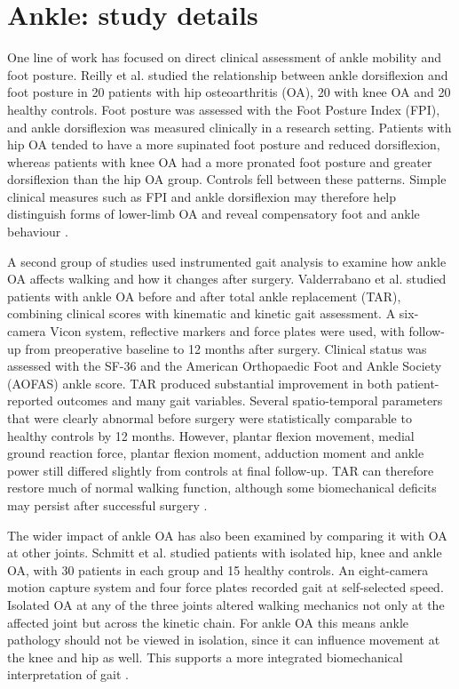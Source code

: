 \documentclass[12pt]{elsarticle}
\begin{document}
\section{Ankle: study details}
\label{supp:S3}
{ One line of work has focused on direct clinical assessment of ankle mobility and foot posture. Reilly et al. \cite{reilly2009role} studied the relationship between ankle dorsiflexion and foot posture in 20 patients with hip osteoarthritis (OA), 20 with knee OA and 20 healthy controls. Foot posture was assessed with the Foot Posture Index (FPI), and ankle dorsiflexion was measured clinically in a research setting. Patients with hip OA tended to have a more supinated foot posture and reduced dorsiflexion, whereas patients with knee OA had a more pronated foot posture and greater dorsiflexion than the hip OA group. Controls fell between these patterns. Simple clinical measures such as FPI and ankle dorsiflexion may therefore help distinguish forms of lower-limb OA and reveal compensatory foot and ankle behaviour \cite{reilly2009role}.}

{ A second group of studies used instrumented gait analysis to examine how ankle OA affects walking and how it changes after surgery. Valderrabano et al. \cite{valderrabano2007gait} studied patients with ankle OA before and after total ankle replacement (TAR), combining clinical scores with kinematic and kinetic gait assessment. A six-camera Vicon system, reflective markers and force plates were used, with follow-up from preoperative baseline to 12 months after surgery. Clinical status was assessed with the SF-36 and the American Orthopaedic Foot and Ankle Society (AOFAS) ankle score. TAR produced substantial improvement in both patient-reported outcomes and many gait variables. Several spatio-temporal parameters that were clearly abnormal before surgery were statistically comparable to healthy controls by 12 months. However, plantar flexion movement, medial ground reaction force, plantar flexion moment, adduction moment and ankle power still differed slightly from controls at final follow-up. TAR can therefore restore much of normal walking function, although some biomechanical deficits may persist after successful surgery \cite{valderrabano2007gait}.}

{ The wider impact of ankle OA has also been examined by comparing it with OA at other joints. Schmitt et al. \cite{schmitt2015effect} studied patients with isolated hip, knee and ankle OA, with 30 patients in each group and 15 healthy controls. An eight-camera motion capture system and four force plates recorded gait at self-selected speed. Isolated OA at any of the three joints altered walking mechanics not only at the affected joint but across the kinetic chain. For ankle OA this means ankle pathology should not be viewed in isolation, since it can influence movement at the knee and hip as well. This supports a more integrated biomechanical interpretation of gait \cite{schmitt2015effect}.}
\end{document}
